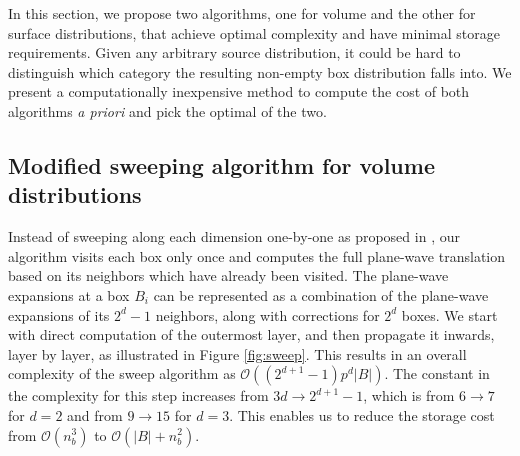In this section, we propose two algorithms, one for volume and the other for surface distributions, that achieve optimal complexity and have minimal storage requirements. Given any arbitrary source distribution, it could be hard to distinguish which category the resulting non-empty box distribution falls into. We present a computationally inexpensive method to compute the cost of both algorithms {\em a priori} and pick the optimal of the two. 

\subsection{Modified sweeping algorithm for volume distributions} 
\label{sec:sweep}

Instead of sweeping along each dimension one-by-one as proposed 
in \cite{fggt}, our algorithm visits each box only once and computes the full plane-wave
translation based on its neighbors which have already been visited. The
plane-wave expansions at a box $B_i$ can be represented as a combination of the
plane-wave expansions of its $2^{d} -1$ neighbors, along with corrections for
$2^d$ boxes. We start with direct computation of the outermost layer, and then propagate it inwards, layer by layer, as illustrated in Figure \ref{fig:sweep}. This results in an overall complexity of the sweep algorithm as $\mathcal{O}((2^{d+1} -1)p^d|B|)$. The constant in the complexity for this step increases from $3d\rightarrow2^{d+1} - 1$, which is
from $6\rightarrow7$ for $d=2$ and from $9\rightarrow15$ for $d=3$. This enables us to reduce the storage cost from $\mathcal{O}(n_b^3)$ to $\mathcal{O}(|B| + n_b^2)$.

